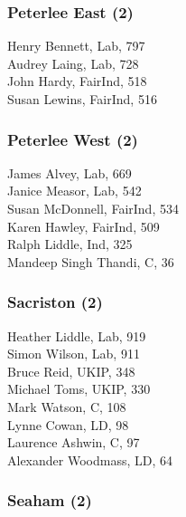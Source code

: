 \documentclass[a4paper,openany,10pt]{book}
\begin{document}
\subsubsection*{Peterlee East (2)}



Henry Bennett, Lab, 797\\
Audrey Laing, Lab, 728\\
John Hardy, FairInd, 518\\
Susan Lewins, FairInd, 516\\


\subsubsection*{Peterlee West (2)}



James Alvey, Lab, 669\\
Janice Measor, Lab, 542\\
Susan McDonnell, FairInd, 534\\
Karen Hawley, FairInd, 509\\
Ralph Liddle, Ind, 325\\
{Mandeep Singh Thandi}, C, 36\\


\subsubsection*{Sacriston (2)}



Heather Liddle, Lab, 919\\
Simon Wilson, Lab, 911\\
Bruce Reid, UKIP, 348\\
Michael Toms, UKIP, 330\\
Mark Watson, C, 108\\
Lynne Cowan, LD, 98\\
Laurence Ashwin, C, 97\\
Alexander Woodmass, LD, 64\\


\subsubsection*{Seaham (2)}

\end{document}
